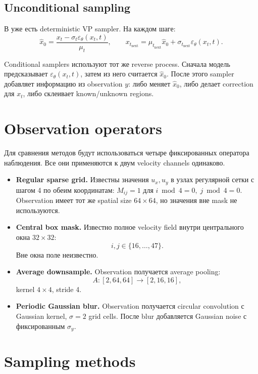 \documentclass[10pt]{article}
\newcommand{\code}[1]{\texttt{\detokenize{#1}}}
\begin{document}
\subsection{Unconditional sampling}

В \code{score_training/sde.py} уже есть deterministic VP sampler. На каждом шаге:
\[
    \hat x_0 =
    \frac{x_t-\sigma_t\varepsilon_\theta(x_t,t)}{\mu_t},
    \qquad
    x_{t_{\mathrm{next}}} =
    \mu_{t_{\mathrm{next}}}\hat x_0
    + \sigma_{t_{\mathrm{next}}}\varepsilon_\theta(x_t,t).
\]

Conditional samplers используют тот же reverse process. Сначала модель предсказывает
\(\varepsilon_\theta(x_t,t)\), затем из него считается \(\hat x_0\). После этого sampler
добавляет информацию из observation \(y\): либо меняет \(\hat x_0\), либо делает correction
для \(x_t\), либо склеивает known/unknown regions.

\section{Observation operators}

Для сравнения методов будут использоваться четыре фиксированных оператора наблюдения.
Все они применяются к двум velocity channels одинаково.

\begin{itemize}
  \item \textbf{Regular sparse grid.} Известны значения \(u_x,u_y\) в узлах регулярной
        сетки с шагом 4 по обеим координатам:
        \(M_{ij}=1\) для \(i\bmod 4=0,\; j\bmod 4=0\).
        Observation имеет тот же spatial size \(64{\times}64\), но значения вне mask
        не используются.
  \item \textbf{Central box mask.} Известно полное velocity field внутри центрального окна
        \(32{\times}32\):
        \[
            i,j \in \{16,\ldots,47\}.
        \]
        Вне окна поле неизвестно.
  \item \textbf{Average downsample.} Observation получается average pooling:
        \[
            A: [2,64,64]\rightarrow [2,16,16],
        \]
        kernel \(4{\times}4\), stride 4.
  \item \textbf{Periodic Gaussian blur.} Observation получается circular convolution
        с Gaussian kernel, \(\sigma=2\) grid cells. После blur добавляется Gaussian noise
        с фиксированным \(\sigma_y\).
\end{itemize}

\section{Sampling methods}
\end{document}
